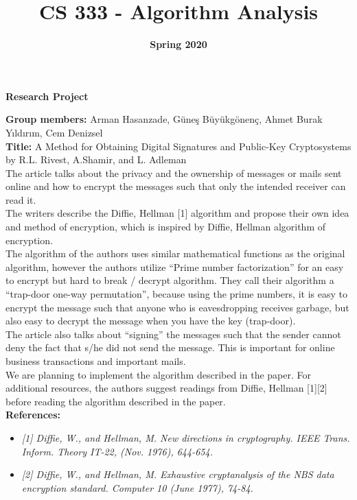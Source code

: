 \documentclass[11pt]{article}
\title{\huge\textbf{CS 333 - Algorithm Analysis}}
\date{\Large\textbf{Spring 2020}}
\begin{document}
\maketitle
\begin{center}
\LARGE\textbf{Research Project}
\\[2\baselineskip]
\end{center}
\setlength{\parindent}{0em}
\textbf{Group members:} Arman Hasanzade, Güneş Büyükgönenç, Ahmet Burak Yıldırım, Cem Denizsel
\\[1\baselineskip]
\textbf{Title:} A Method for Obtaining Digital Signatures and Public-Key Cryptosystems by R.L. Rivest, A.Shamir, and L. Adleman
\\[2\baselineskip]
The article talks about the privacy and the ownership of messages or mails sent online and how to encrypt the messages such that only the intended receiver can read it.\\
The writers describe the Diffie, Hellman [1] algorithm and propose their own idea and method of encryption, which is inspired by Diffie, Hellman algorithm of encryption.\\
The algorithm of the authors uses similar mathematical functions as the original algorithm, however the authors utilize “Prime number factorization” for an easy to encrypt but hard to break / decrypt algorithm.
They call their algorithm a “trap-door one-way permutation”, because using the prime numbers, it is easy to encrypt the message such that anyone who is eavesdropping receives garbage, but also easy to decrypt the message when you have the key (trap-door).\\
The article also talks about “signing” the messages such that the sender cannot deny the fact that s/he did not send the message. This is important for online business transactions and important mails.
\\[1em]
We are planning to implement the algorithm described in the paper. For additional resources, the authors suggest readings from Diffie, Hellman [1][2] before reading the algorithm described in the paper.
\\[5\baselineskip]
\textbf{References:}
\begin{itemize}
	\item \textit{[1] Diffie, W., and Hellman, M. New directions in cryptography. IEEE Trans. Inform. Theory IT-22, (Nov. 1976), 644-654.}
	\item \textit{[2] Diffie, W., and Hellman, M. Exhaustive cryptanalysis of the NBS data encryption standard. Computer 10 (June 1977), 74-84.}
\end{itemize}
\end{document}
